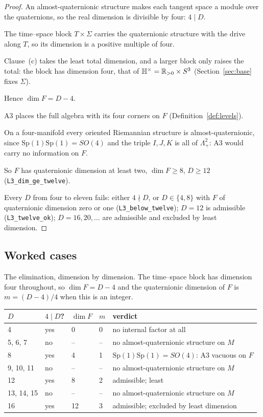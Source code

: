 \documentclass[11pt,a4paper]{article}
\theoremstyle{plain}
\theoremstyle{definition}
\theoremstyle{remark}
\newcommand{\Hquat}{\mathbb{H}}
\begin{document}
\begin{proof}
An almost-quaternionic structure makes each tangent space a module over the quaternions, so the real dimension is divisible by four: $4\mid D$.

The time--space block $T\times\Sigma$ carries the quaternionic structure with the drive along $T$, so its dimension is a positive multiple of four.

Clause~(c) takes the least total dimension, and a larger block only raises the total: the block has dimension four, that of $\Hquat^{\times}=\R_{>0}\times S^{3}$ (Section~\ref{sec:base} fixes $\Sigma$).

Hence $\dim F=D-4$.

A3 places the full algebra with its four corners on $F$ (Definition~\ref{def:levels}).

On a four-manifold every oriented Riemannian structure is almost-quaternionic, since $\mathrm{Sp}(1)\mathrm{Sp}(1)=SO(4)$ and the triple $I,J,K$ is all of $\Lambda^{2}_{+}$: A3 would carry no information on $F$.

So $F$ has quaternionic dimension at least two, $\dim F\geq8$, $D\geq12$ (\texttt{L3\_dim\_ge\_twelve}).

Every $D$ from four to eleven fails: either $4\nmid D$, or $D\in\{4,8\}$ with $F$ of quaternionic dimension zero or one (\texttt{L3\_below\_twelve}); $D=12$ is admissible (\texttt{L3\_twelve\_ok}); $D=16,20,\dots$ are admissible and excluded by least dimension.
\end{proof}

\subsection{Worked cases}\label{sec:dim-worked}

The elimination, dimension by dimension. The time--space block has dimension four throughout, so $\dim F=D-4$ and the quaternionic dimension of $F$ is $m=(D-4)/4$ when this is an integer.

\begin{center}
\begin{tabular}{lllll}
\toprule
$D$ & $4\mid D$? & $\dim F$ & $m$ & verdict\\
\midrule
4 & yes & 0 & 0 & no internal factor at all\\
5, 6, 7 & no & -- & -- & no almost-quaternionic structure on $M$\\
8 & yes & 4 & 1 & $\mathrm{Sp}(1)\mathrm{Sp}(1)=SO(4)$: A3 vacuous on $F$\\
9, 10, 11 & no & -- & -- & no almost-quaternionic structure on $M$\\
12 & yes & 8 & 2 & admissible; least\\
13, 14, 15 & no & -- & -- & no almost-quaternionic structure on $M$\\
16 & yes & 12 & 3 & admissible; excluded by least dimension\\
\bottomrule
\end{tabular}
\end{center}
\end{document}

